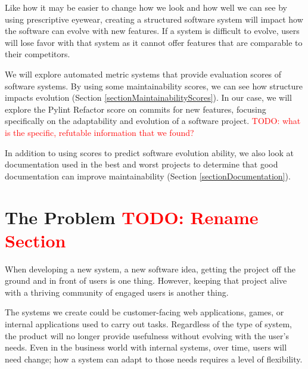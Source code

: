 \documentclass[12pt,conference]{IEEEtran}
\newcommand\todo[1]{\textcolor{red}{#1}}
\begin{document}
Like how it may be easier to change how we look and how well we can see by using prescriptive eyewear, creating a structured software system will impact how the software can evolve with new features. If a system is difficult to evolve, users will lose favor with that system as it cannot offer features that are comparable to their competitors.


We will explore automated metric systems that provide evaluation scores of software systems. By using some maintainability scores, we can see how structure impacts evolution (Section \ref{sectionMaintainabilityScores}). In our case, we will explore the Pylint Refactor score on commits for new features, focusing specifically on the adaptability and evolution of a software project. \todo{TODO: what is the specific, refutable information that we found?}

In addition to using scores to predict software evolution ability, we also look at documentation used in the best and worst projects to determine that good documentation can improve maintainability (Section \ref{sectionDocumentation}).


\vspace{0.5cm}
\section{The Problem \todo{TODO: Rename Section}}
\vspace{0.25cm}


When developing a new system, a new software idea, getting the project off the ground and in front of users is one thing. However, keeping that project alive with a thriving community of engaged users is another thing.

The systems we create could be customer-facing web applications, games, or internal applications used to carry out tasks. Regardless of the type of system, the product will no longer provide usefulness without evolving with the user's needs. Even in the business world with internal systems, over time, users will need change; how a system can adapt to those needs requires a level of flexibility.
\end{document}
